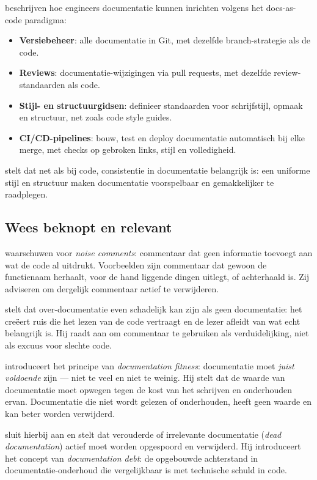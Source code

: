 \textcite{bhatti2021docsdevelopers} beschrijven hoe engineers documentatie kunnen inrichten volgens het docs-as-code paradigma:

\begin{itemize}
    \item \textbf{Versiebeheer}: alle documentatie in Git, met dezelfde branch-strategie als de code.
    \item \textbf{Reviews}: documentatie-wijzigingen via pull requests, met dezelfde review-standaarden als code.
    \item \textbf{Stijl- en structuurgidsen}: definieer standaarden voor schrijfstijl, opmaak en structuur, net zoals code style guides.
    \item \textbf{CI/CD-pipelines}: bouw, test en deploy documentatie automatisch bij elke merge, met checks op gebroken links, stijl en volledigheid.
\end{itemize}

\textcite{martin2008clean} stelt dat net als bij code, consistentie in documentatie belangrijk is: een uniforme stijl en structuur maken documentatie voorspelbaar en gemakkelijker te raadplegen.

\subsection{Wees beknopt en relevant}
\textcite{boswell2011readablecode} waarschuwen voor \textit{noise comments}: commentaar dat geen informatie toevoegt aan wat de code al uitdrukt. Voorbeelden zijn commentaar dat gewoon de functienaam herhaalt, voor de hand liggende dingen uitlegt, of achterhaald is. Zij adviseren om dergelijk commentaar actief te verwijderen.

\textcite{martin2008clean} stelt dat over-documentatie even schadelijk kan zijn als geen documentatie: het creëert ruis die het lezen van de code vertraagt en de lezer afleidt van wat echt belangrijk is. Hij raadt aan om commentaar te gebruiken als verduidelijking, niet als excuus voor slechte code.

\textcite{ruping2005agiledocumentation} introduceert het principe van \textit{documentation fitness}: documentatie moet \textit{juist voldoende} zijn --- niet te veel en niet te weinig. Hij stelt dat de waarde van documentatie moet opwegen tegen de kost van het schrijven en onderhouden ervan. Documentatie die niet wordt gelezen of onderhouden, heeft geen waarde en kan beter worden verwijderd.

\textcite{martraire2019livingdocumentation} sluit hierbij aan en stelt dat verouderde of irrelevante documentatie (\textit{dead documentation}) actief moet worden opgespoord en verwijderd. Hij introduceert het concept van \textit{documentation debt}: de opgebouwde achterstand in documentatie-onderhoud die vergelijkbaar is met technische schuld in code.


